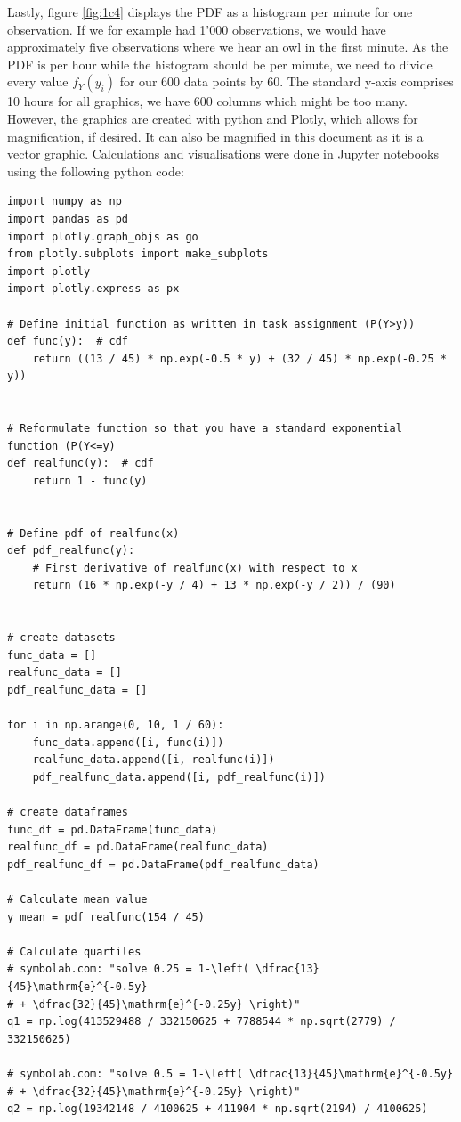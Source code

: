 Lastly, figure \eqref{fig:1c4} displays the PDF as a histogram per minute for one observation. If we for example had 1'000 observations, we would have approximately five observations where we hear an owl in the first minute. As the PDF is per hour while the histogram should be per minute, we need to divide every value $f_Y(y_i)$ for our 600 data points by 60. The standard y-axis comprises 10 hours for all graphics, we have 600 columns which might be too many. However, the graphics are created with python and Plotly, which allows for magnification, if desired. It can also be magnified in this document as it is a vector graphic.
Calculations and visualisations were done in Jupyter notebooks using the following python code:
\begin{verbatim}
import numpy as np
import pandas as pd
import plotly.graph_objs as go
from plotly.subplots import make_subplots
import plotly
import plotly.express as px

# Define initial function as written in task assignment (P(Y>y))
def func(y):  # cdf
    return ((13 / 45) * np.exp(-0.5 * y) + (32 / 45) * np.exp(-0.25 * y))


# Reformulate function so that you have a standard exponential function (P(Y<=y)
def realfunc(y):  # cdf
    return 1 - func(y)


# Define pdf of realfunc(x)
def pdf_realfunc(y):
    # First derivative of realfunc(x) with respect to x
    return (16 * np.exp(-y / 4) + 13 * np.exp(-y / 2)) / (90)


# create datasets
func_data = []
realfunc_data = []
pdf_realfunc_data = []

for i in np.arange(0, 10, 1 / 60):
    func_data.append([i, func(i)])
    realfunc_data.append([i, realfunc(i)])
    pdf_realfunc_data.append([i, pdf_realfunc(i)])

# create dataframes
func_df = pd.DataFrame(func_data)
realfunc_df = pd.DataFrame(realfunc_data)
pdf_realfunc_df = pd.DataFrame(pdf_realfunc_data)

# Calculate mean value
y_mean = pdf_realfunc(154 / 45)

# Calculate quartiles
# symbolab.com: "solve 0.25 = 1-\left( \dfrac{13}{45}\mathrm{e}^{-0.5y}
# + \dfrac{32}{45}\mathrm{e}^{-0.25y} \right)"
q1 = np.log(413529488 / 332150625 + 7788544 * np.sqrt(2779) / 332150625)

# symbolab.com: "solve 0.5 = 1-\left( \dfrac{13}{45}\mathrm{e}^{-0.5y}
# + \dfrac{32}{45}\mathrm{e}^{-0.25y} \right)"
q2 = np.log(19342148 / 4100625 + 411904 * np.sqrt(2194) / 4100625)


\end{verbatim}
